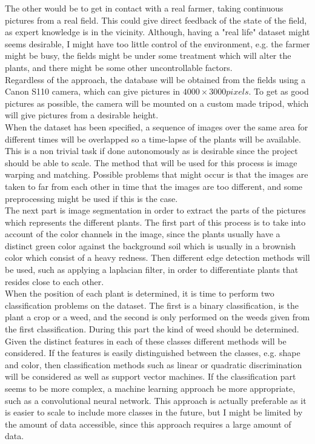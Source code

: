 The other would be to get in contact with a real farmer, taking continuous pictures from a real field. This could give direct feedback of the state of the field, as expert knowledge is in the vicinity. Although, having a "real life" dataset might seems desirable, I might have too little control of the environment, e.g. the farmer might be busy, the fields might be under some treatment which will alter the plants, and there might be some other uncontrollable factors.\\

Regardless of the approach, the database will be obtained from the fields using a Canon S110 camera, which can give pictures in $4000 \times 3000 pixels$. To get as good pictures as possible, the camera will be mounted on a custom made tripod, which will give pictures from a desirable height.\\

When the dataset has been specified, a sequence of images over the same area for different times will be overlapped so a time-lapse of the plants will be available. This is a non trivial task if done autonomously as is desirable since the project should be able to scale. The method that will be used for this process is image warping and matching. Possible problems that might occur is that the images are taken to far from each other in time that the images are too different, and some preprocessing might be used if this is the case.\\

The next part is image segmentation in order to extract the parts of the pictures which represents the different plants. The first part of this process is to take into account of the color channels in the image, since the plants usually have a distinct green color against the background soil which is usually in a brownish color which consist of a heavy redness. Then different edge detection methods will be used, such as applying a laplacian filter, in order to differentiate plants that resides close to each other.\\

When the position of each plant is determined, it is time to perform two classification problems on the dataset. The first is a binary classification, is the plant a crop or a weed, and the second is only performed on the weeds given from the first classification. During this part the kind of weed should be determined. Given the distinct features in each of these classes different methods will be considered. If the features is easily distinguished between the classes, e.g. shape and color, then classification methods such as linear or quadratic discrimination will be considered as well as support vector machines. If the classification part seems to be more complex, a machine learning approach be more appropriate, such as a convolutional neural network. This approach is actually preferable as it is easier to scale to include more classes in the future, but I might be limited by the amount of data accessible, since this approach requires a large amount of data.\\

